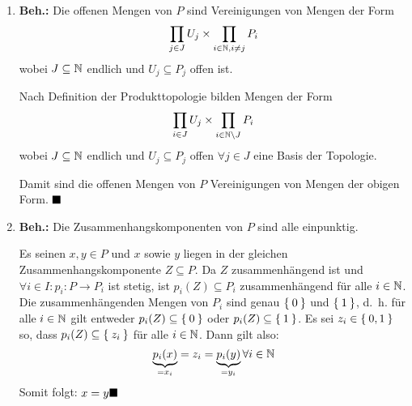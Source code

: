\begin{solution}[\ref{ub2:aufg4}]
    \begin{enumerate}[label=(\alph*)]
        \item \textbf{Beh.:} Die offenen Mengen von $P$ sind
              Vereinigungen von Mengen der Form 
              \[\prod_{j \in J} U_j \times \prod_{i \in \mathbb{N}, i \neq j} P_i\]
              wobei $J \subseteq \mathbb{N}$ endlich und $U_j \subseteq P_j$
              offen ist.
              \begin{beweis}
                Nach Definition der Produkttopologie bilden Mengen
                der Form
                \[\prod_{i \in J} U_j \times \prod_{i \in \mathbb{N} \setminus J} P_i\]
                wobei $J \subseteq \mathbb{N}$ endlich und $U_j \subseteq P_j$ offen
                $\forall{j \in J}$
                eine Basis der Topologie.

                Damit sind die offenen 
                Mengen von $P$ Vereinigungen von Mengen der obigen
                Form. $\qed$
              \end{beweis}
        \item \textbf{Beh.:} Die Zusammenhangskomponenten von $P$
              sind alle einpunktig.
              \begin{beweis}
                Es seinen $x,y \in P$ und $x$ sowie $y$ liegen in der
                gleichen Zusammenhangskomponente $Z \subseteq P$.
                Da $Z$ zusammenhängend ist und $\forall{i \in I}: p_i : P \rightarrow P_i$
                ist stetig, ist $p_i(Z) \subseteq P_i$ zusammenhängend
                für alle $i \in \mathbb{N}$. Die zusammenhängenden Mengen
                von $P_i$ sind genau $\Set{0}$ und $\Set{1}$, d.~h.
                für alle $i \in \mathbb{N}$ gilt entweder $p_i(Z) \subseteq \Set{0}$
                oder $p_i(Z) \subseteq \Set{1}$. Es sei $z_i \in \Set{0,1}$
                so, dass $p_i(Z) \subseteq \Set{z_i}$ für alle $i \in \mathbb{N}$.
                Dann gilt also: 
                \[\underbrace{p_i(x)}_{= x_i} = z_i = \underbrace{p_i(y)}_{= y_i} \forall i \in \mathbb{N}\]
                Somit folgt: $x = y \qed$
                
              \end{beweis}
    \end{enumerate}
\end{solution}

